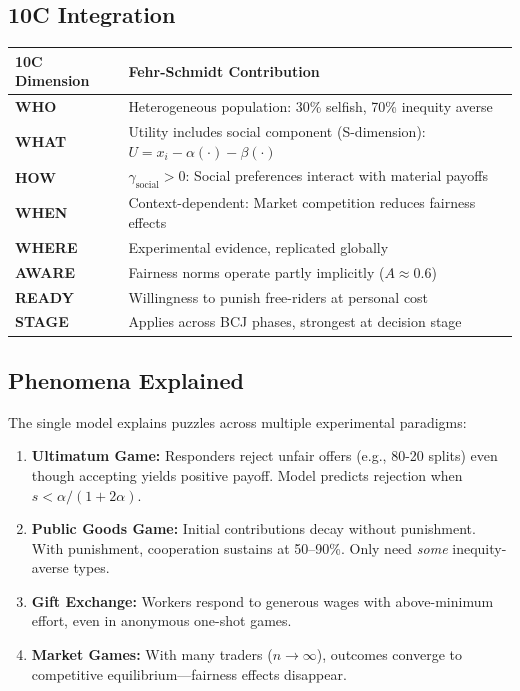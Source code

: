 \subsection{10C Integration}

\begin{center}
\renewcommand{\arraystretch}{1.2}
\small
\begin{tabular}{lp{10cm}}
\hline
\textbf{10C Dimension} & \textbf{Fehr-Schmidt Contribution} \\
\hline
\textbf{WHO} & Heterogeneous population: 30\% selfish, 70\% inequity averse \\
\textbf{WHAT} & Utility includes social component (S-dimension): $U = x_i - \alpha(\cdot) - \beta(\cdot)$ \\
\textbf{HOW} & $\gamma_{\text{social}} > 0$: Social preferences interact with material payoffs \\
\textbf{WHEN} & Context-dependent: Market competition reduces fairness effects \\
\textbf{WHERE} & Experimental evidence, replicated globally \\
\textbf{AWARE} & Fairness norms operate partly implicitly ($A \approx 0.6$) \\
\textbf{READY} & Willingness to punish free-riders at personal cost \\
\textbf{STAGE} & Applies across BCJ phases, strongest at decision stage \\
\hline
\end{tabular}
\end{center}

\subsection{Phenomena Explained}

The single model explains puzzles across multiple experimental paradigms:

\begin{enumerate}[nosep]
    \item \textbf{Ultimatum Game:} Responders reject unfair offers (e.g., 80-20 splits)
    even though accepting yields positive payoff. Model predicts rejection when
    $s < \alpha/(1+2\alpha)$.

    \item \textbf{Public Goods Game:} Initial contributions decay without punishment.
    With punishment, cooperation sustains at 50--90\%. Only need \textit{some}
    inequity-averse types.

    \item \textbf{Gift Exchange:} Workers respond to generous wages with above-minimum
    effort, even in anonymous one-shot games.

    \item \textbf{Market Games:} With many traders ($n \to \infty$), outcomes converge
    to competitive equilibrium---fairness effects disappear.
\end{enumerate}

